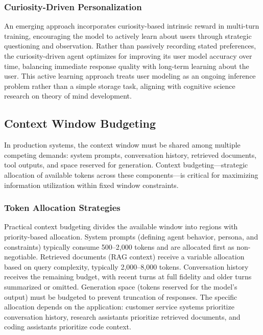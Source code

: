 \documentclass[11pt,letterpaper]{article}
\begin{document}
\subsubsection{Curiosity-Driven Personalization}

An emerging approach incorporates curiosity-based intrinsic reward in multi-turn training, encouraging the model to actively learn about users through strategic questioning and observation. Rather than passively recording stated preferences, the curiosity-driven agent optimizes for improving its user model accuracy over time, balancing immediate response quality with long-term learning about the user. This active learning approach treats user modeling as an ongoing inference problem rather than a simple storage task, aligning with cognitive science research on theory of mind development.

\subsection{Context Window Budgeting}

In production systems, the context window must be shared among multiple competing demands: system prompts, conversation history, retrieved documents, tool outputs, and space reserved for generation. Context budgeting---strategic allocation of available tokens across these components---is critical for maximizing information utilization within fixed window constraints.

\subsubsection{Token Allocation Strategies}

Practical context budgeting divides the available window into regions with priority-based allocation. System prompts (defining agent behavior, persona, and constraints) typically consume 500--2,000 tokens and are allocated first as non-negotiable. Retrieved documents (RAG context) receive a variable allocation based on query complexity, typically 2,000--8,000 tokens. Conversation history receives the remaining budget, with recent turns at full fidelity and older turns summarized or omitted. Generation space (tokens reserved for the model's output) must be budgeted to prevent truncation of responses. The specific allocation depends on the application: customer service systems prioritize conversation history, research assistants prioritize retrieved documents, and coding assistants prioritize code context.
\end{document}
